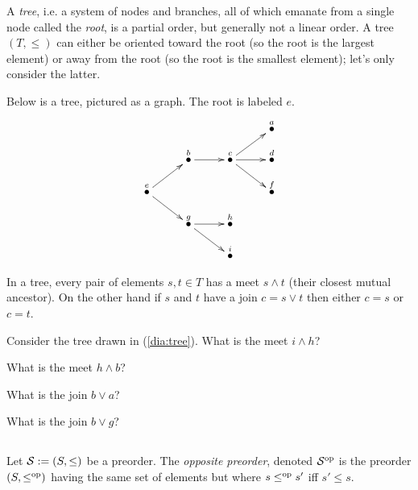\begin{exampleENG}[Trees]\label{ex:tree}
A {\em tree}, i.e. a system of nodes and branches, all of which emanate from a single node called the {\em root}, is a partial order, but generally not a linear order. A tree $(T,\leq)$ can either be oriented toward the root (so the root is the largest element) or away from the root (so the root is the smallest element); let's only consider the latter. 

Below is a tree, pictured as a graph. The root is labeled $e$.
\begin{align}\label{dia:tree}
\xymatrix@=10pt{
&&&&&&\LMO{a}\\
&&\LMO{b}\ar[rr]&&\LMO{c}\ar[urr]\ar[rr]\ar[drr]&&\LMO{d}\\
\LMO{e}\ar[urr]\ar[drr]&&&&&&\LMO{f}\\
&&\LMO{g}\ar[rr]\ar[drr]&&\LMO{h}\\
&&&&\LMO{i}
}
\end{align}

In a tree, every pair of elements $s, t\in T$ has a meet $s\wedge t$ (their closest mutual ancestor). On the other hand if $s$ and $t$ have a join $c=s\vee t$ then either $c=s$ or $c=t$. 
\end{exampleENG}

\begin{exampleRUS}[Trees]\label{ex:tree}
\end{exampleRUS}

\begin{exerciseENG}
Consider the tree drawn in (\ref{dia:tree}).
\sexc What is the meet $i\wedge h$?
\item What is the meet $h\wedge b$?
\item What is the join $b\vee a$?
\item What is the join $b\vee g$?
\endsexc
\end{exerciseENG}

\begin{exerciseRUS}
\end{exerciseRUS}


\subsection{}

\begin{definitionENG}\label{def:opposite order}
Let $\mathcal{S}:=(S,\leq)$ be a preorder. The {\em opposite preorder}, denoted $\mathcal{S}^\textnormal{op}$ is the preorder $(S,\leq^\textnormal{op})$ having the same set of elements but where $s\leq^\textnormal{op} s'$ iff $s'\leq s$.
\end{definitionENG}

